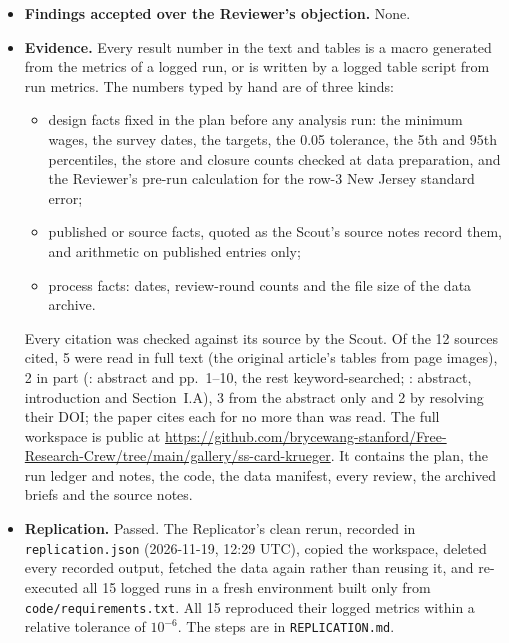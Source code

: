 \begin{itemize}
\begin{itemize}
          \item results round~2 (two findings), answered in the run notes and claims before
                the results gate;
          \item paper round~2 (four findings), answered in this version: an attribution of
                the H2 narrowing to particular stores that no logged run supports was
                removed, the findings of the two results reviews are now assigned to the
                right round, ``every number'' was narrowed to ``every result number'', and
                this item was completed.
        \end{itemize}
  \item \textbf{Findings accepted over the Reviewer's objection.} None.
  \item \textbf{Evidence.} Every result number in the text and tables is a macro generated
        from the metrics of a logged run, or is written by a logged table script from run
        metrics. The numbers typed by hand are of three kinds:
        \begin{itemize}
          \item design facts fixed in the plan before any analysis run: the minimum wages,
                the survey dates, the targets, the 0.05 tolerance, the 5th and 95th
                percentiles, the store and closure counts checked at data preparation, and
                the Reviewer's pre-run calculation for the row-3 New Jersey standard error;
          \item published or source facts, quoted as the Scout's source notes record them,
                and arithmetic on published entries only;
          \item process facts: dates, review-round counts and the file size of the data
                archive.
        \end{itemize}
        Every citation was checked against its source by the Scout. Of the 12 sources cited, 5
        were read in full text (the original article's tables from page images), 2 in part
        (\citet{neumark1995payroll}: abstract and pp.~1--10, the rest keyword-searched;
        \citet{card1998reanalysis}: abstract, introduction and Section~I.A), 3 from the
        abstract only and 2 by resolving their DOI; the paper cites each for no more than
        was read. The full workspace is public at
        \url{https://github.com/brycewang-stanford/Free-Research-Crew/tree/main/gallery/ss-card-krueger}.
        It contains the plan, the run ledger and notes, the code, the data manifest, every
        review, the archived briefs and the source notes.
  \item \textbf{Replication.} Passed. The Replicator's clean rerun, recorded in
        \texttt{replication.json} (2026-11-19, 12:29 UTC), copied the workspace, deleted every recorded output, fetched the data
        again rather than reusing it, and re-executed all 15 logged runs in a fresh
        environment built only from \texttt{code/requirements.txt}. All 15 reproduced
        their logged metrics within a relative tolerance of $10^{-6}$. The steps are in
        \texttt{REPLICATION.md}.
\end{itemize}
